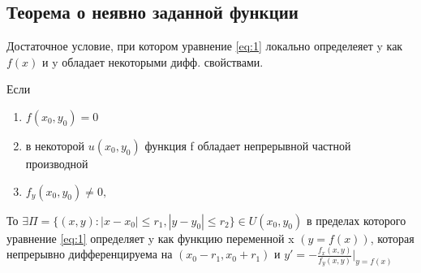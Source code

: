 \subsection{Теорема о неявно заданной функции}
Достаточное условие, при котором уравнение \ref{eq:1} локально определеяет y как $f(x)$ и y обладает некоторыми дифф. свойствами.

\begin{theorem}
	Если \begin{enumerate}
		\item $f(x_0,y_0)=0$ \label{enum:1}
		\item в некоторой $u(x_0,y_0)$ функция f обладает непрерывной частной производной\label{enum:2}
		\item $f_y(x_0,y_0)\ne0,$ \label{enum:3}
	\end{enumerate}
То $\exists \Pi=\{(x,y): |x-x_0|\leq r_1, |y-y_0|\leq r_2\} \in U(x_0,y_0)$ в пределах которого уравнение \ref{eq:1} определяет y как функцию переменной x $(y=f(x))$, которая непрерывно дифференцируема на $(x_0-r_1, x_0+r_1)$ и $y'=-\frac{f_x(x,y)}{f_y(x,y)}\left.\right|_{y=f(x)}$
\end{theorem}
